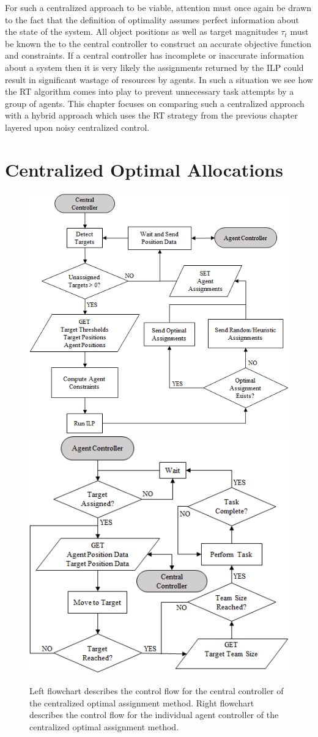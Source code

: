 \documentclass[12pt]{book}
\begin{document}
For such a centralized approach to be viable, attention must once again be drawn to the fact that the definition of optimality assumes perfect information about the state of the system. All object positions as well as target magnitudes $\tau_t$ must be known the to the central controller to construct an accurate objective function and constraints. If a central controller has incomplete or inaccurate information about a system then it is very likely the assignments returned by the ILP could result in significant wastage of resources by agents. In such a situation we see how the RT algorithm comes into play to prevent unnecessary task attempts by a group of agents.  This chapter focuses on comparing such a centralized approach with a hybrid approach which uses the RT strategy from the previous chapter layered upon noisy centralized control.

\section{Centralized Optimal Allocations}
\begin{figure}[!ht]
\centering\includegraphics[width=.49\columnwidth]{../assets/CentralController.png}
\centering\includegraphics[width=.49\columnwidth]{../assets/AgentController.png}
\centering\caption{Left flowchart describes the control flow for the central controller of the centralized optimal assignment method. Right flowchart describes the control flow for the individual agent controller of the centralized optimal assignment method.}\label{fig:centralcontrol}
\end{figure}
\end{document}
